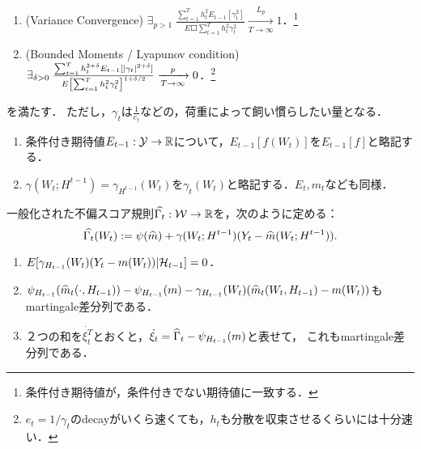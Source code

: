 \documentclass[uplatex,dvipdfmx]{jsreport}
\begin{document}
\begin{definition}
\begin{enumerate}
\begin{axiom}
\begin{enumerate}
                \item (Variance Convergence) $\exists_{p>1}\;\frac{\sum^T_{t=1}h_t^2E_{t-1}[\gamma^2_t]}{E\Square{\sum^T_{t=1}h_t^2\gamma_t^2}}\xrightarrow[T\to\infty]{L_p}1$．\footnote{条件付き期待値が，条件付きでない期待値に一致する．}
                \item (Bounded Moments / Lyapunov condition) 
                $\exists_{\delta>0}\;\frac{\sum^T_{t=1}h_t^{2+\delta}E_{t-1}[\lvert\gamma_t\rvert^{2+\delta}]}{E\left[\sum^T_{t=1}h^2_t\gamma^2_t\right]^{1+\delta/2}}\xrightarrow[T\to\infty]{p}0$．\footnote{$e_t=1/\gamma_t$のdecayがいくら速くても，$h_t$も分散を収束させるくらいには十分速い．}
            \end{enumerate}
            を満たす．
            ただし，$\gamma_t$は$\frac{1}{e_t}$などの，荷重によって飼い慣らしたい量となる．
        \end{axiom}
    \end{enumerate}
\end{definition}

\begin{notation}\mbox{}
    \begin{enumerate}
        \item 条件付き期待値$E_{t-1}:\mathcal{Y}\to\mathbb{R}$について，$E_{t-1}[f(W_t)]$を$E_{t-1}[f]$と略記する．
        \item $\gamma(W_t;H^{t-1})=\gamma_{H^{t-1}}(W_t)$を$\gamma_{t}(W_t)$と略記する．$E_{t},m_{t}$なども同様．
    \end{enumerate}
\end{notation}

\begin{definition}[一般化された不偏スコア規則]
    一般化された不偏スコア規則$\widehat{\Gamma_t}:\mathcal{W}\to\mathbb{R}$を，次のように定める：
    \[\widehat{\Gamma_t}(W_t):=\psi(\widehat{m})+\gamma(W_t;H^{t-1})(Y_t-\widehat{m}(W_t;H^{t-1})).\]
\end{definition}

\begin{lemma}[不偏スコアが不偏推定量となっている]\mbox{}
    \begin{enumerate}
        \item $E[\gamma_{H_{t-1}}(W_t)(Y_t-m(W_t))|\mathcal{H}_{t-1}]=0$．
        \item $\psi_{H_{t-1}}(\widehat{m}_t(\cdot,H_{t-1}))-\psi_{H_{t-1}}(m)-\gamma_{H_{t-1}}(W_t)(\widehat{m}_t(W_t,H_{t-1})-m(W_t))$もmartingale差分列である．
        \item ２つの和を$\dot{\xi^T_t}$とおくと，$\dot{\xi_t}=\widehat{\Gamma}_t-\psi_{H_{t-1}}(m)$と表せて，
        これもmartingale差分列である．
    \end{enumerate}
\end{lemma}
\end{document}
